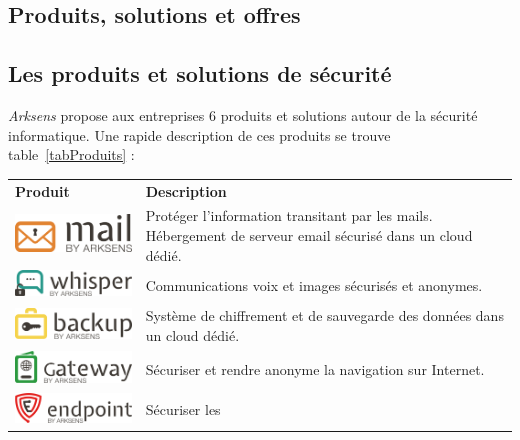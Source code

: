 \documentclass[a4paper,10pt, twoside]{report}
\begin{document}
\begin{spacing}{1.2}
\section{Produits, solutions et offres}
\subsection{Les produits et solutions de sécurité}
\textit{Arksens} propose aux entreprises 6 produits et solutions autour de la
sécurité informatique. Une rapide description de ces produits se trouve
table~\ref{tabProduits} :
\begin{table}[h!]
  \centering
  \def\arraystretch{1.5}
  \setlength{\fboxsep}{13pt} %
  \setlength{\fboxrule}{0pt} %
  \begin{tabular}{m{6cm}m{6cm}}
   \rowcolor{arkred} 
    \arrayrulecolor{gray73}\hline
    \color{white} \textbf{Produit} & \color{white} \textbf{Description} \\
    \includegraphics[width=5cm, fbox]{produits/mail.png} & Protéger l'information
    transitant par les mails. Hébergement de serveur email sécurisé dans
    un cloud dédié.\\
    \hline
    \includegraphics[width=5cm, fbox]{produits/whisper.png} & Communications voix
    et images sécurisés et anonymes.\\
    \hline
    \includegraphics[width=5cm, fbox]{produits/backup.png} & Système de
    chiffrement et de sauvegarde des données dans un cloud dédié.\\
    \hline
    \includegraphics[width=5cm, fbox]{produits/gateway.png} & Sécuriser et
    rendre anonyme la navigation sur Internet.\\
    \hline
    \includegraphics[width=5cm, fbox]{produits/endpoint.png} & Sécuriser les

\end{tabular}
\end{table}
\end{spacing}
\end{document}
